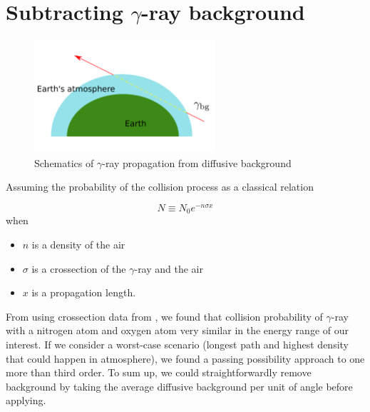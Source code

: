 \chapter{Subtracting $\gamma$-ray background}
\label{appendix:bg_subtraction}

\begin{figure}[h!]
    \centering
      \includegraphics[width=0.6\textwidth]{appendix/bg_subtraction/backgroundSubtract.pdf}
      \caption{Schematics of $\gamma$-ray propagation from diffusive background}
\end{figure}


Assuming the probability of the collision process as a classical relation 

\begin{equation}
    N \equiv N_0 e^{-n\sigma x}
\end{equation}
when
\begin{itemize}
    \item $n$ is a density of the air
    \item $\sigma$ is a crossection of the $\gamma$-ray and the air
    \item $x$ is a propagation length.
\end{itemize}
From using crossection data from \cite{XCOMNIST},
we found that collision probability of $\gamma$-ray
with a nitrogen atom and oxygen atom very similar in
the energy range of our interest.
If we consider a worst-case scenario 
(longest path and highest density that could happen in atmosphere),
we found a passing possibility approach to one more than third order.
To sum up, we could straightforwardly remove background by taking
the average diffusive background per unit of angle before applying.

